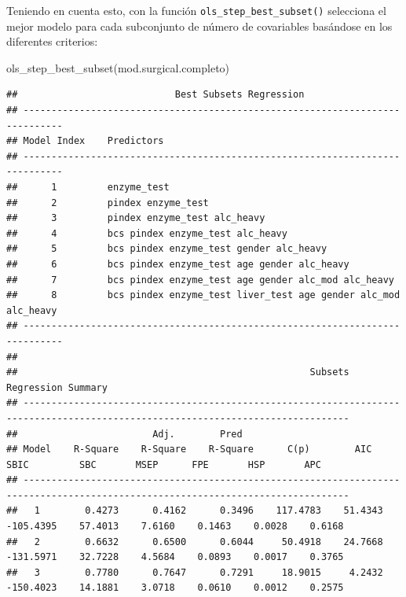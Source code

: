 \documentclass[
]{article}
\newenvironment{Shaded}{\begin{snugshade}}{\end{snugshade}}
\newcommand{\FunctionTok}[1]{\textcolor[rgb]{0.00,0.00,0.00}{#1}}
\newcommand{\NormalTok}[1]{#1}
\begin{document}
Teniendo en cuenta esto, con la función \texttt{ols\_step\_best\_subset()} selecciona el mejor modelo para cada subconjunto de número de covariables basándose en los diferentes criterios:

\begin{Shaded}
\begin{Highlighting}[]
\FunctionTok{ols\_step\_best\_subset}\NormalTok{(mod.surgical.completo)}
\end{Highlighting}
\end{Shaded}

\begin{verbatim}
##                            Best Subsets Regression                           
## -----------------------------------------------------------------------------
## Model Index    Predictors
## -----------------------------------------------------------------------------
##      1         enzyme_test                                                    
##      2         pindex enzyme_test                                             
##      3         pindex enzyme_test alc_heavy                                   
##      4         bcs pindex enzyme_test alc_heavy                               
##      5         bcs pindex enzyme_test gender alc_heavy                        
##      6         bcs pindex enzyme_test age gender alc_heavy                    
##      7         bcs pindex enzyme_test age gender alc_mod alc_heavy            
##      8         bcs pindex enzyme_test liver_test age gender alc_mod alc_heavy 
## -----------------------------------------------------------------------------
## 
##                                                    Subsets Regression Summary                                                   
## --------------------------------------------------------------------------------------------------------------------------------
##                        Adj.        Pred                                                                                          
## Model    R-Square    R-Square    R-Square      C(p)        AIC        SBIC         SBC       MSEP      FPE       HSP       APC  
## --------------------------------------------------------------------------------------------------------------------------------
##   1        0.4273      0.4162      0.3496    117.4783    51.4343    -105.4395    57.4013    7.6160    0.1463    0.0028    0.6168 
##   2        0.6632      0.6500      0.6044     50.4918    24.7668    -131.5971    32.7228    4.5684    0.0893    0.0017    0.3765 
##   3        0.7780      0.7647      0.7291     18.9015     4.2432    -150.4023    14.1881    3.0718    0.0610    0.0012    0.2575 

\end{verbatim}
\end{document}
